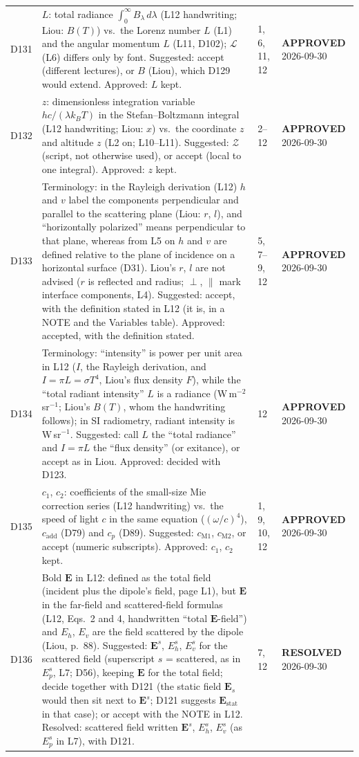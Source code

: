 \documentclass[11pt, oneside]{article}
\newcommand{\approved}{\textbf{APPROVED}}
\newcommand{\resolved}{\textbf{RESOLVED}}
\begin{document}
\begin{longtable}{l >{\raggedright\arraybackslash}p{} l l}
D131 & $L$: total radiance $\int_0^\infty B_\lambda\,d\lambda$ (L12 handwriting; Liou: $B(T)$) vs.\ the Lorenz number $L$ (L1) and the angular momentum $L$ (L11, D102); $\mathcal{L}$ (L6) differs only by font. Suggested: accept (different lectures), or $B$ (Liou), which D129 would extend. Approved: $L$ kept. & 1, 6, 11, 12 & \approved{} 2026-09-30 \\
D132 & $z$: dimensionless integration variable $hc/(\lambda k_BT)$ in the Stefan--Boltzmann integral (L12 handwriting; Liou: $x$) vs.\ the coordinate $z$ and altitude $z$ (L2 on; L10--L11). Suggested: $\mathcal{Z}$ (script, not otherwise used), or accept (local to one integral). Approved: $z$ kept. & 2--12 & \approved{} 2026-09-30 \\
D133 & Terminology: in the Rayleigh derivation (L12) $h$ and $v$ label the components perpendicular and parallel to the scattering plane (Liou: $r$, $l$), and ``horizontally polarized'' means perpendicular to that plane, whereas from L5 on $h$ and $v$ are defined relative to the plane of incidence on a horizontal surface (D31). Liou's $r$, $l$ are not advised ($r$ is reflected and radius; $\perp$, $\parallel$ mark interface components, L4). Suggested: accept, with the definition stated in L12 (it is, in a NOTE and the Variables table). Approved: accepted, with the definition stated. & 5, 7--9, 12 & \approved{} 2026-09-30 \\
D134 & Terminology: ``intensity'' is power per unit area in L12 ($I$, the Rayleigh derivation, and $I = \pi L = \sigma T^4$, Liou's flux density $F$), while the ``total radiant intensity'' $L$ is a radiance (W\,m$^{-2}$\,sr$^{-1}$; Liou's $B(T)$, whom the handwriting follows); in SI radiometry, radiant intensity is W\,sr$^{-1}$. Suggested: call $L$ the ``total radiance'' and $I = \pi L$ the ``flux density'' (or exitance), or accept as in Liou. Approved: decided with D123. & 12 & \approved{} 2026-09-30 \\
D135 & $c_1$, $c_2$: coefficients of the small-size Mie correction series (L12 handwriting) vs.\ the speed of light $c$ in the same equation ($(\omega/c)^4$), $c_\mathrm{add}$ (D79) and $c_p$ (D89). Suggested: $c_{\mathrm{M}1}$, $c_{\mathrm{M}2}$, or accept (numeric subscripts). Approved: $c_1$, $c_2$ kept. & 1, 9, 10, 12 & \approved{} 2026-09-30 \\
D136 & Bold $\mathbf{E}$ in L12: defined as the total field (incident plus the dipole's field, page L1), but $\mathbf{E}$ in the far-field and scattered-field formulas (L12, Eqs.~2 and 4, handwritten ``total $\mathbf{E}$-field'') and $E_h$, $E_v$ are the field scattered by the dipole (Liou, p.~88). Suggested: $\mathbf{E}^s$, $E_h^s$, $E_v^s$ for the scattered field (superscript $s$ = scattered, as in $E_p^s$, L7; D56), keeping $\mathbf{E}$ for the total field; decide together with D121 (the static field $\mathbf{E}_s$ would then sit next to $\mathbf{E}^s$; D121 suggests $\mathbf{E}_\mathrm{stat}$ in that case); or accept with the NOTE in L12. Resolved: scattered field written $\mathbf{E}^s$, $E_h^s$, $E_v^s$ (as $E_p^s$ in L7), with D121. & 7, 12 & \resolved{} 2026-09-30 \\

\end{longtable}
\end{document}
